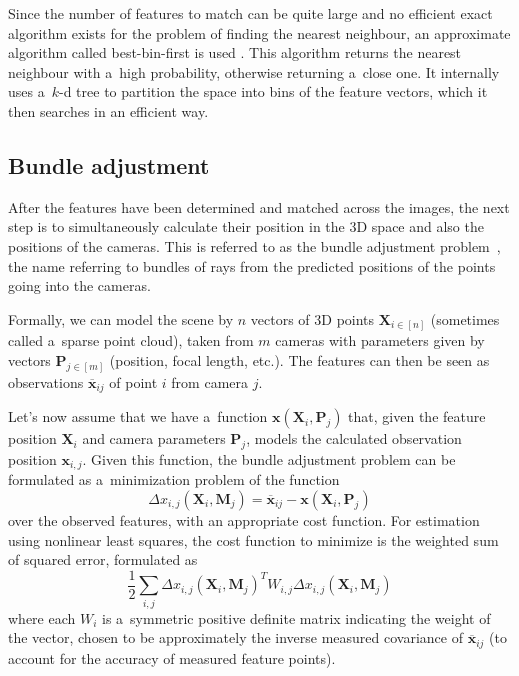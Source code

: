 Since the number of features to match can be quite large and no efficient exact algorithm exists for the problem of finding the nearest neighbour, an approximate algorithm called best-bin-first is used \cite{beis1997shape}.
This algorithm returns the nearest neighbour with a~high probability, otherwise returning a~close one.
It internally uses a~$k$-d tree to partition the space into bins of the feature vectors, which it then searches in an efficient way.

\subsection{Bundle adjustment}
After the features have been determined and matched across the images, the next step is to simultaneously calculate their position in the 3D space and also the positions of the cameras.
This is referred to as the bundle adjustment problem~\cite{triggs1999bundle}, the name referring to bundles of rays from the predicted positions of the points going into the cameras.

Formally, we can model the scene by $n$ vectors of 3D points $\mathbf{X}_{i \in [n]}$ (sometimes called a~sparse point cloud), taken from $m$ cameras with parameters given by vectors $\mathbf{P}_{j \in [m]}$ (position, focal length, etc.).
The features can then be seen as observations $\overline{\bm{x}}_{ij}$ of point $i$ from camera $j$.

Let's now assume that we have a~function $\bm{x}(\mathbf{X}_i, \mathbf{P}_j)$ that, given the feature position $\mathbf{X}_i$ and camera parameters $\mathbf{P}_j$, models the calculated observation position $\mathbf{x}_{i, j}$.
Given this function, the bundle adjustment problem can be formulated as a~minimization problem of the function \begin{equation} \Delta x_{i, j} (\mathbf{X}_i, \mathbf{M}_j) = \overline{\bm{x}}_{ij} - \bm{x}(\mathbf{X}_i, \mathbf{P}_j) \end{equation} over the observed features, with an appropriate cost function. For estimation using nonlinear least squares, the cost function to minimize is the weighted sum of squared error, formulated as 
\begin{equation} \frac{1}{2} \sum_{i,j} \Delta x_{i, j} (\mathbf{X}_i, \mathbf{M}_j)^T W_{i,j} \Delta x_{i, j} (\mathbf{X}_i, \mathbf{M}_j) \end{equation}
where each $W_i$ is a~symmetric positive definite matrix indicating the weight of the vector, chosen to be approximately the inverse measured covariance of $\overline{\bm{x}}_{ij}$ (to account for the accuracy of measured feature points).

